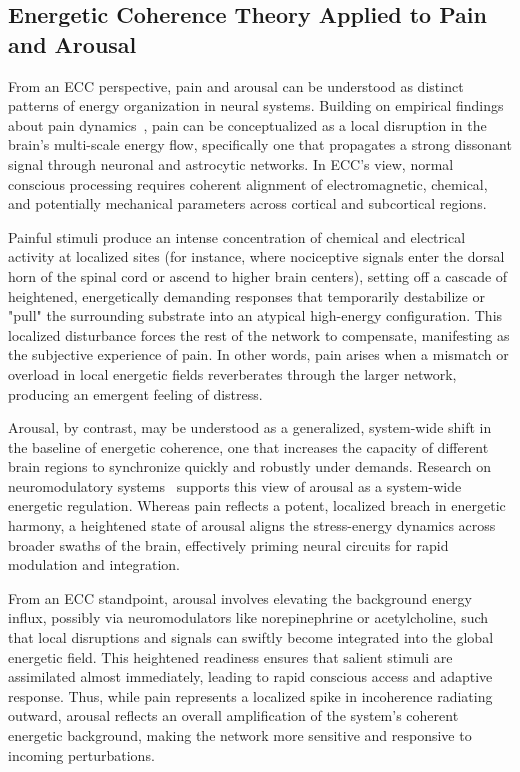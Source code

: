 \subsection*{Energetic Coherence Theory Applied to Pain and Arousal}

From an ECC perspective, pain and arousal can be understood as distinct patterns of energy organization in neural systems. Building on empirical findings about pain dynamics~\cite{pinotsis2023cytoelectric, hunt2024electromagnetic}, pain can be conceptualized as a local disruption in the brain's multi-scale energy flow, specifically one that propagates a strong dissonant signal through neuronal and astrocytic networks. In ECC's view, normal conscious processing requires coherent alignment of electromagnetic, chemical, and potentially mechanical parameters across cortical and subcortical regions.

Painful stimuli produce an intense concentration of chemical and electrical activity at localized sites (for instance, where nociceptive signals enter the dorsal horn of the spinal cord or ascend to higher brain centers), setting off a cascade of heightened, energetically demanding responses that temporarily destabilize or "pull" the surrounding substrate into an atypical high-energy configuration. This localized disturbance forces the rest of the network to compensate, manifesting as the subjective experience of pain. In other words, pain arises when a mismatch or overload in local energetic fields reverberates through the larger network, producing an emergent feeling of distress.

Arousal, by contrast, may be understood as a generalized, system-wide shift in the baseline of energetic coherence, one that increases the capacity of different brain regions to synchronize quickly and robustly under demands. Research on neuromodulatory systems~\cite{Pfaff2006, Saper2010} supports this view of arousal as a system-wide energetic regulation. Whereas pain reflects a potent, localized breach in energetic harmony, a heightened state of arousal aligns the stress-energy dynamics across broader swaths of the brain, effectively priming neural circuits for rapid modulation and integration.

From an ECC standpoint, arousal involves elevating the background energy influx, possibly via neuromodulators like norepinephrine or acetylcholine, such that local disruptions and signals can swiftly become integrated into the global energetic field. This heightened readiness ensures that salient stimuli are assimilated almost immediately, leading to rapid conscious access and adaptive response. Thus, while pain represents a localized spike in incoherence radiating outward, arousal reflects an overall amplification of the system's coherent energetic background, making the network more sensitive and responsive to incoming perturbations.

